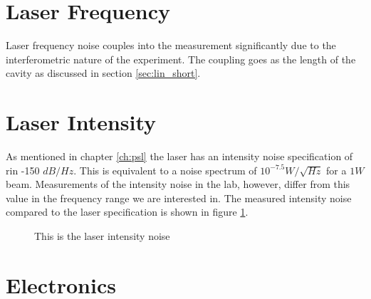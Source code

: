 
\section{Laser Frequency}

Laser frequency noise couples into the measurement significantly due to the
interferometric nature of the experiment.
The coupling goes as the length of the cavity as discussed in section
\ref{sec:lin_short}.

\section{Laser Intensity}

As mentioned in chapter \ref{ch:psl} the laser has an intensity noise
specification of \ac{rin} -150 $dB/Hz$. This is equivalent to a noise
spectrum of $10^{-7.5} W/\sqrt{H\!z}$ for a $1 W$ beam.
Measurements of the intensity noise in the lab, however, differ from this
value in the frequency range we are interested in.
The measured intensity noise compared to the laser specification is shown
in figure \ref{fig:intensitynoise}.

\begin{figure}[htbp]
  \caption[Intensity Noise]{This is the laser intensity noise}
  \label{fig:intensitynoise}
\end{figure}


\section{Electronics}



